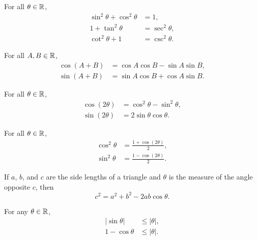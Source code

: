 \newpage

\begin{theorem}
For all $\theta\in\mathbb R$,
\begin{align*}
\sin^2\theta + \cos^2\theta &= 1,\\
1+\tan^2\theta &= \sec^2\theta,\\
\cot^2\theta+1 &=\csc^2\theta.
\end{align*}
\end{theorem}
\vfill

\begin{theorem}
For all $A,B\in\mathbb R$,
\begin{align*}
\cos(A+B) &=\cos A\cos B - \sin A\sin B,\\
\sin(A+B) &=\sin A\cos B+\cos A\sin B.
\end{align*}
\end{theorem}
\vfill

\begin{theorem}
For all $\theta\in\mathbb R$,
\begin{align*}
\cos(2\theta) &= \cos^2\theta-\sin^2\theta,\\
\sin(2\theta) &= 2\sin\theta\cos\theta.
\end{align*}
\end{theorem}
\vfill

\begin{theorem}
For all $\theta\in\mathbb R$,
\begin{align*}
\cos^2\theta &= \frac{1+\cos(2\theta)}{2},\\
\sin^2\theta &= \frac{1-\cos(2\theta)}{2}.
\end{align*}
\end{theorem}
\vfill

\begin{theorem}
If $a$, $b$, and $c$ are the side lengths of a triangle and $\theta$ is the measure of the angle opposite $c$, then
\begin{equation*}
c^2=a^2+b^2-2ab\cos\theta.
\end{equation*}
\end{theorem}
\vfill

\newpage

\begin{theorem}
For any $\theta\in\mathbb R$,
\begin{align*}
|\sin\theta|&\le |\theta|,\\
1-\cos\theta &\le |\theta|.
\end{align*}
\end{theorem}

